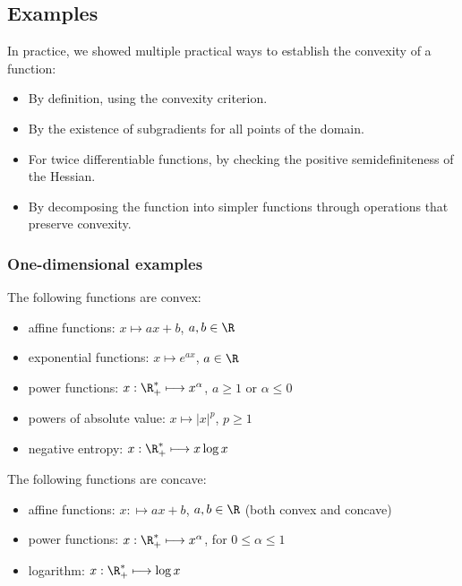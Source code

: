 \subsection{Examples}
In practice, we showed multiple practical ways to establish the convexity of a function:
\begin{itemize}
    \item By definition, using the convexity criterion.
    \item By the existence of subgradients for all points of the domain.
    \item For twice differentiable functions, by checking the positive semidefiniteness of the Hessian.
    \item By decomposing the function into simpler functions through operations that preserve convexity.
\end{itemize}

\subsubsection{One-dimensional examples}
The following functions are convex:
\begin{itemize}
    \item affine functions: $x\longmapsto ax+b$, $a,b\in\R$
    \item exponential functions: $x\longmapsto e^{ax}$, $a\in\R$
    \item power functions: $x:\R^*_+ \longmapsto x^\alpha$, $a\geq 1$ or $\alpha\leq0$
    \item powers of absolute value: $x\longmapsto |x|^p$, $p\geq 1$
    \item negative entropy: $x:\R^*_+ \longmapsto x\log x$
\end{itemize}

The following functions are concave:
\begin{itemize}
    \item affine functions: $x:\longmapsto ax+b$, $a,b\in\R$ (both convex and concave)
    \item power functions: $x:\R^*_+ \longmapsto x^\alpha$, for $0\leq\alpha\leq1$
    \item logarithm: $x:\R^*_+ \longmapsto \log x$
\end{itemize}


